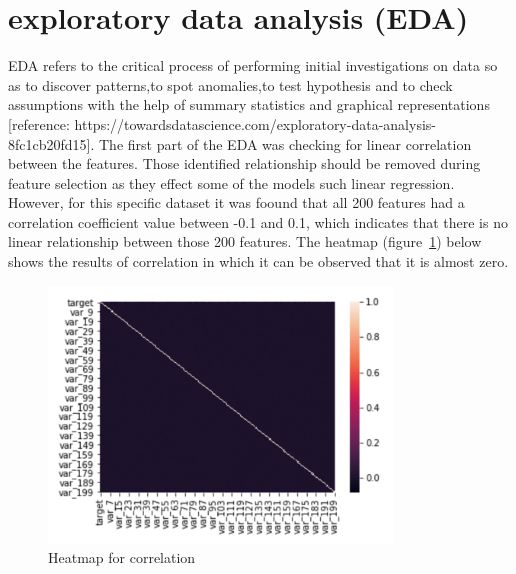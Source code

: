 \documentclass[journal,twoside,web]{ieeecolor}
\begin{document}
\section{exploratory data analysis (EDA)}
EDA refers to the critical process of performing initial investigations on data so as to discover patterns,to spot anomalies,to test hypothesis and to check assumptions with the help of summary statistics and graphical representations [reference: https://towardsdatascience.com/exploratory-data-analysis-8fc1cb20fd15].
The first part of the EDA was checking for linear correlation between the features. Those identified relationship should be removed during feature selection as they effect some of the models such linear regression. However, for this specific dataset it was foound that all 200 features had a correlation coefficient value between -0.1 and 0.1, which indicates that there is no linear relationship between those 200 features. The heatmap (figure~\ref{fig:fig1}) below shows the results of correlation in which it can be observed that it is almost zero. 
\begin{figure}[h!]
  \centering
  \includegraphics[width=3.6in]{project/code/heatmap.png}
  \caption{Heatmap for correlation}
  \label{fig:fig1}
\end{figure}
\end{document}
